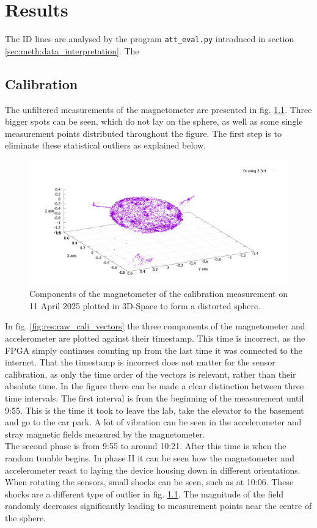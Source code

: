 \chapter{Results \label{ch:results}}
The ID lines are analysed by the program \verb|att_eval.py| introduced in section \ref{sec:meth:data_interpretation}. The

\section{Calibration \label{sec:res:calibration}}
The unfiltered measurements of the magnetometer are presented in fig. \ref{fig:res:raw_cali}. Three bigger spots can be seen, which do not lay on the sphere, as well as some single measurement points distributed throughout the figure. The first step is to eliminate these statistical outliers as explained below.

\begin{figure}[H]
    \centering
    \includegraphics[width=0.8\linewidth]{images/04_results/raw_sphere_2025-04-11.pdf}
    \caption{Components of the magnetometer of the calibration measurement on 11 April 2025 plotted in 3D-Space to form a distorted sphere.}
    \label{fig:res:raw_cali}
\end{figure}

In fig. \ref{fig:res:raw_cali_vectors} the three components of the magnetometer and accelerometer are plotted against their timestamp. This time is incorrect, as the \ac{FPGA} simply continues counting up from the last time it was connected to the internet. That the timestamp is incorrect does not matter for the sensor calibration, as only the time order of the vectors is relevant, rather than their absolute time. In the figure there can be made a clear distinction between three time intervals. The first interval is from the beginning of the measurement until 9:55. This is the time it took to leave the lab, take the elevator to the basement and go to the car park. A lot of vibration can be seen in the accelerometer and stray magnetic fields measured by the magnetometer.\\
The second phase is from 9:55 to around 10:21. After this time is when the random tumble begins. In phase II it can be seen how the magnetometer and accelerometer react to laying the device housing down in different orientations. When rotating the sensors, small shocks can be seen, such as at 10:06. These shocks are a different type of outlier in fig. \ref{fig:res:raw_cali}. The magnitude of the field randomly decreases significantly leading to measurement points near the centre of the sphere.

